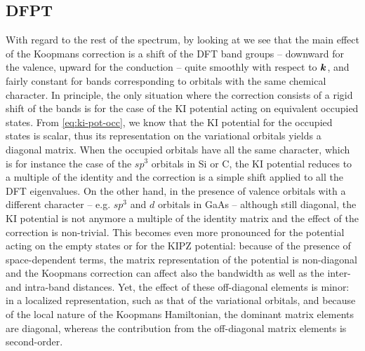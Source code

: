 \subsection{DFPT\label{sec:results-dfpt}}
With regard to the rest of the spectrum, by looking at  we see that the main effect of the Koopmans correction is a shift of the DFT band groups -- downward for the valence, upward for the conduction -- quite smoothly with respect to ${\bm k}$, and fairly constant for bands corresponding to orbitals with the same chemical character. In principle, the only situation where the correction consists of a rigid shift of the bands is for the case of the KI potential acting on equivalent occupied states. From \cref{eq:ki-pot-occ}, we know that the KI potential for the occupied states is scalar, thus its representation on the variational orbitals yields a diagonal matrix. When the occupied orbitals have all the same character, which is for instance the case of the $sp^3$ orbitals in Si or C, the KI potential reduces to a multiple of the identity and the correction is a simple shift applied to all the DFT eigenvalues. On the other hand, in the presence of valence orbitals with a different character -- e.g. $sp^3$ and $d$ orbitals in GaAs -- although still diagonal, the KI potential is not anymore a multiple of the identity matrix and the effect of the correction is non-trivial. This becomes even more pronounced for the potential acting on the empty states or for the KIPZ potential: because of the presence of space-dependent terms, the matrix representation of the potential is non-diagonal and the Koopmans correction can affect also the bandwidth as well as the inter- and intra-band distances. Yet, the effect of these off-diagonal elements is minor: in a localized representation, such as that of the variational orbitals, and because of the local nature of the Koopmans Hamiltonian, the dominant matrix elements are diagonal, whereas the contribution from the off-diagonal matrix elements is second-order.

